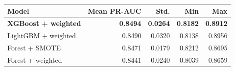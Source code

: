 \begin{tabular}{l r r r r}
\hline
\textbf{Model} & \textbf{Mean PR-AUC} & \textbf{Std.} & \textbf{Min} & \textbf{Max} \\
\hline
\textbf{XGBoost + weighted} & \textbf{0.8494} & \textbf{0.0264} & \textbf{0.8182} & \textbf{0.8912} \\
LightGBM + weighted & 0.8490 & 0.0320 & 0.8138 & 0.8956 \\
Forest + SMOTE & 0.8471 & 0.0179 & 0.8212 & 0.8695 \\
Forest + weighted & 0.8441 & 0.0240 & 0.8039 & 0.8659 \\
\hline
\end{tabular}